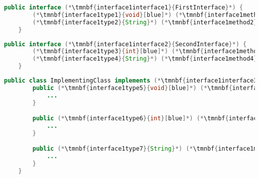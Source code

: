 \begin{lstlisting}[language=Java, title={First interface}]
    public interface (*\tmnbf{interface1interface1}{FirstInterface}*) {
        (*\tmnbf{interface1type1}{void}[blue]*) (*\tmnbf{interface1method1}{firstInterfaceMethod}*)();
        (*\tmnbf{interface1type2}{String}*) (*\tmnbf{interface1method2}{commonMethod}*)((*\tmnbf{interface1paramtype1}{Object}*) (*\tmnbf{interface1param1}{commonMethodParam}*));
    }
\end{lstlisting}
\begin{lstlisting}[language=Java, title={Second interface}]
    public interface (*\tmnbf{interface1interface2}{SecondInterface}*) {
        (*\tmnbf{interface1type3}{int}[blue]*) (*\tmnbf{interface1method3}{secondInterfaceMethod}*)();
        (*\tmnbf{interface1type4}{String}*) (*\tmnbf{interface1method4}{commonMethod}*)((*\tmnbf{interface1paramtype2}{Object}*) (*\tmnbf{interface1param2}{commonMethodParam}*));
    }
\end{lstlisting}
\begin{lstlisting}[language=Java, title={Implementing class}]
    public class ImplementingClass implements (*\tmnbf{interface1interface3}{FirstInterface}*), (*\tmnbf{interface1interface4}{SecondInterface}*) {
        public (*\tmnbf{interface1type5}{void}[blue]*) (*\tmnbf{interface1method5}{firstInterfaceMethod}*)() {
            ...
        }

        public (*\tmnbf{interface1type6}{int}[blue]*) (*\tmnbf{interface1method6}{secondInterfaceMethod}*)() {
            ...
        }

        public (*\tmnbf{interface1type7}{String}*) (*\tmnbf{interface1method7}{commonMethod}*)((*\tmnbf{interface1paramtype3}{Object}*) (*\tmnbf{interface1param3}{commonMethodParam}*)) {
            ...
        }
    }
\end{lstlisting}


